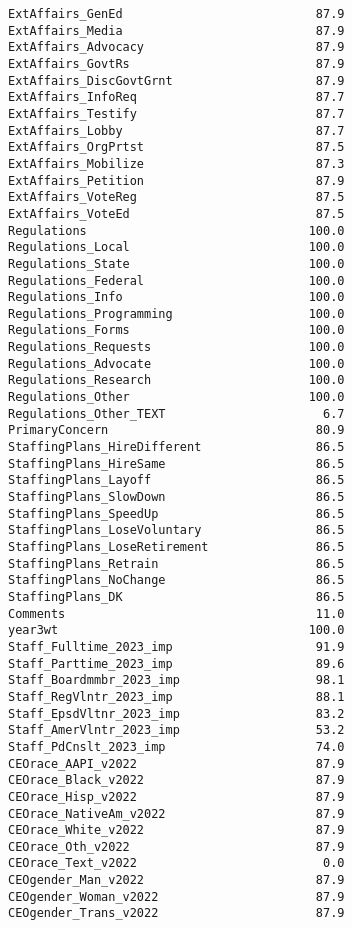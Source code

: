 \documentclass[
  letterpaper,
]{scrbook}
\begin{document}
\begin{verbatim}
ExtAffairs_GenEd                           87.9
ExtAffairs_Media                           87.9
ExtAffairs_Advocacy                        87.9
ExtAffairs_GovtRs                          87.9
ExtAffairs_DiscGovtGrnt                    87.9
ExtAffairs_InfoReq                         87.7
ExtAffairs_Testify                         87.7
ExtAffairs_Lobby                           87.7
ExtAffairs_OrgPrtst                        87.5
ExtAffairs_Mobilize                        87.3
ExtAffairs_Petition                        87.9
ExtAffairs_VoteReg                         87.5
ExtAffairs_VoteEd                          87.5
Regulations                               100.0
Regulations_Local                         100.0
Regulations_State                         100.0
Regulations_Federal                       100.0
Regulations_Info                          100.0
Regulations_Programming                   100.0
Regulations_Forms                         100.0
Regulations_Requests                      100.0
Regulations_Advocate                      100.0
Regulations_Research                      100.0
Regulations_Other                         100.0
Regulations_Other_TEXT                      6.7
PrimaryConcern                             80.9
StaffingPlans_HireDifferent                86.5
StaffingPlans_HireSame                     86.5
StaffingPlans_Layoff                       86.5
StaffingPlans_SlowDown                     86.5
StaffingPlans_SpeedUp                      86.5
StaffingPlans_LoseVoluntary                86.5
StaffingPlans_LoseRetirement               86.5
StaffingPlans_Retrain                      86.5
StaffingPlans_NoChange                     86.5
StaffingPlans_DK                           86.5
Comments                                   11.0
year3wt                                   100.0
Staff_Fulltime_2023_imp                    91.9
Staff_Parttime_2023_imp                    89.6
Staff_Boardmmbr_2023_imp                   98.1
Staff_RegVlntr_2023_imp                    88.1
Staff_EpsdVltnr_2023_imp                   83.2
Staff_AmerVlntr_2023_imp                   53.2
Staff_PdCnslt_2023_imp                     74.0
CEOrace_AAPI_v2022                         87.9
CEOrace_Black_v2022                        87.9
CEOrace_Hisp_v2022                         87.9
CEOrace_NativeAm_v2022                     87.9
CEOrace_White_v2022                        87.9
CEOrace_Oth_v2022                          87.9
CEOrace_Text_v2022                          0.0
CEOgender_Man_v2022                        87.9
CEOgender_Woman_v2022                      87.9
CEOgender_Trans_v2022                      87.9

\end{verbatim}
\end{document}
